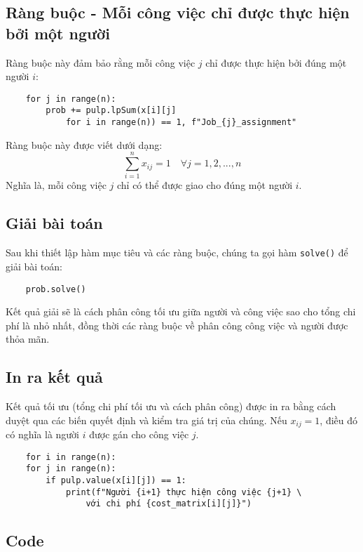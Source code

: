 \subsection{Ràng buộc - Mỗi công việc chỉ được thực hiện bởi một người}

Ràng buộc này đảm bảo rằng mỗi công việc \(j\) chỉ được thực hiện bởi đúng một người \(i\):

\begin{verbatim}
    for j in range(n):
        prob += pulp.lpSum(x[i][j]
            for i in range(n)) == 1, f"Job_{j}_assignment"
\end{verbatim}

Ràng buộc này được viết dưới dạng:
\[
\sum_{i=1}^{n} x_{ij} = 1 \quad \forall j = 1, 2, ..., n
\]
Nghĩa là, mỗi công việc \(j\) chỉ có thể được giao cho đúng một người \(i\).

\subsection{Giải bài toán}

Sau khi thiết lập hàm mục tiêu và các ràng buộc, chúng ta gọi hàm \texttt{solve()} để giải bài toán:

\begin{verbatim}
    prob.solve()
\end{verbatim}

Kết quả giải sẽ là cách phân công tối ưu giữa người và công việc sao cho tổng chi phí là nhỏ nhất, đồng thời các ràng buộc về phân công công việc và người được thỏa mãn.

\subsection{In ra kết quả}

Kết quả tối ưu (tổng chi phí tối ưu và cách phân công) được in ra bằng cách duyệt qua các biến quyết định và kiểm tra giá trị của chúng. Nếu \(x_{ij} = 1\), điều đó có nghĩa là người \(i\) được gán cho công việc \(j\).

\begin{verbatim}
    for i in range(n):
    for j in range(n):
        if pulp.value(x[i][j]) == 1:
            print(f"Người {i+1} thực hiện công việc {j+1} \
                với chi phí {cost_matrix[i][j]}")
\end{verbatim}

\subsection{Code}



